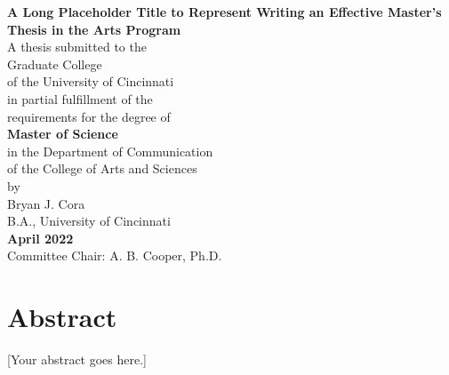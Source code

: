 \documentclass[11pt, letterpaper, oneside]{report}
\begin{document}
\begin{titlepage}
    \begin{center}
        \pagestyle{empty}
        {\large\textbf{A Long Placeholder Title to Represent Writing an Effective Master's Thesis in the Arts Program}}\\[1.25in]

        A thesis submitted to the\\
        Graduate College\\
        of the University of Cincinnati\\
        in partial fulfillment of the\\
        requirements for the degree of\\[0.25in]

        \textbf{Master of Science}\\[0.25in]

        in the Department of Communication\\
        of the College of Arts and Sciences\\

        by\\[0.25in]
        Bryan J. Cora\\
        B.A., University of Cincinnati\\

        \textbf{April 2022}\\[1 in]

        Committee Chair: A. B. Cooper, Ph.D.
    \end{center}
\end{titlepage}

\clearpage

\setcounter{page}{2}
\chapter*{Abstract}

[Your abstract goes here.]

\clearpage

\chapter*{}
\thispagestyle{empty}
\clearpage
\end{document}
